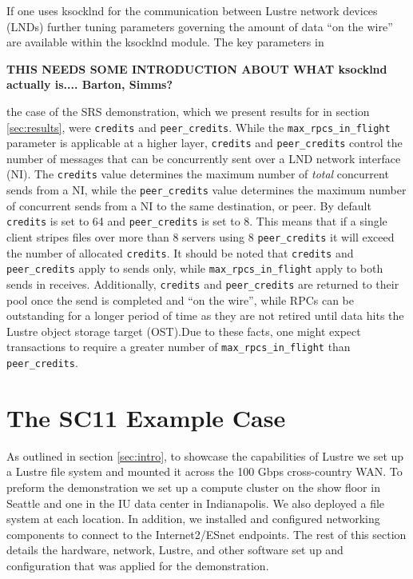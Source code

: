 \documentclass[]{sigplan-proc}
\begin{document}
If one uses ksocklnd for the communication between Lustre network devices (LNDs) further tuning parameters
governing the amount of data ``on the wire'' are available within the ksocklnd module. The key parameters in

{\bf THIS NEEDS SOME INTRODUCTION ABOUT WHAT ksocklnd actually is.... Barton, Simms?}

the case of the SRS demonstration, which we present results for in section \ref{sec:results}, were 
{\tt credits} and {\tt peer\_credits}. While the {\tt max\_rpcs\_in\_flight} parameter is applicable at a higher
layer, {\tt credits} and {\tt peer\_credits} control the number of messages that can be concurrently sent over
a LND network interface (NI). The {\tt credits} value determines the maximum number of {\it total} concurrent
sends from a NI, while the {\tt peer\_credits} value determines the maximum number of concurrent sends from a
NI to the same destination, or peer. By default {\tt credits} is set to 64 and {\tt peer\_credits} is set to
8. This means that if a single client stripes files over more than 8 servers using 8 {\tt peer\_credits} it
will exceed the number of allocated {\tt credits}. It should be noted that {\tt credits} and {\tt
  peer\_credits} apply to sends only, while {\tt max\_rpcs\_in\_flight} apply to both sends in
receives. Additionally, {\tt credits} and {\tt peer\_credits} are returned to their pool once the send is
completed and ``on the wire'', while RPCs can be outstanding for a longer period of time as they are not
retired until data hits the Lustre object storage target (OST).Due to these facts, one might expect
transactions to require a greater number of {\tt max\_rpcs\_in\_flight} than {\tt peer\_credits}.
 

\section {The SC11 Example Case}\label{sec:usecase}

As outlined in section \ref{sec:intro}, to showcase the capabilities of Lustre we set up a Lustre
file system and mounted it across the 100 Gbps cross-country WAN. To preform the demonstration we set up a
compute cluster on the show floor in Seattle and one in the IU data center in Indianapolis. We also deployed a
file system at each location. In addition, we installed and configured networking components to connect to the
Internet2/ESnet endpoints. The rest of this section details the hardware, network, Lustre, and other software
set up and configuration that was applied for the demonstration.
\end{document}

